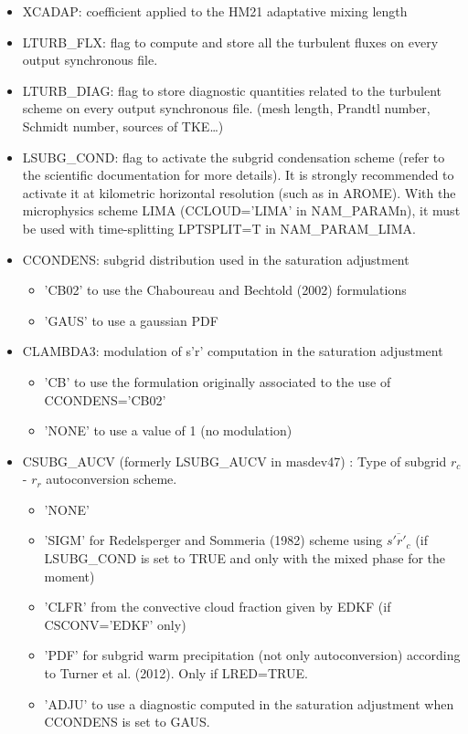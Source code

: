 \begin{itemize}
\item
{} 
XCADAP: coefficient applied to the HM21 adaptative mixing length

\item
{}
LTURB\_FLX: flag to compute and store all the turbulent fluxes
 on every output synchronous file.

\item
{}
LTURB\_DIAG: flag to  store diagnostic quantities related to the 
turbulent scheme  on every output synchronous file. (mesh length, Prandtl
number, Schmidt number, sources of TKE\ldots)

\item
{}
LSUBG\_COND: flag to activate the subgrid condensation scheme (refer to the scientific 
documentation for more details). It is strongly recommended to activate it at kilometric horizontal resolution (such as in AROME).  With the microphysics scheme LIMA (CCLOUD='LIMA' in NAM\_PARAMn), it must be used with time-splitting LPTSPLIT=T in NAM\_PARAM\_LIMA.

\item
{}
CCONDENS: subgrid distribution used in the saturation adjustment
\begin{itemize}
\item  'CB02' to use the Chaboureau and Bechtold (2002) formulations
\item 'GAUS' to use a gaussian PDF
\end{itemize}

\item
{}
CLAMBDA3: modulation of s'r' computation in the saturation adjustment
\begin{itemize}
\item 'CB' to use the formulation originally associated to the use of CCONDENS='CB02'
\item 'NONE' to use a value of 1 (no modulation)
\end{itemize}

\item
{}
CSUBG\_AUCV (formerly LSUBG\_AUCV in masdev47) : Type of subgrid $r_c$ - $r_r$ autoconversion scheme.
\begin{itemize}
\item  'NONE'
\item 'SIGM' for Redelsperger and Sommeria (1982) scheme using $\overline{s'r'_{c}}$ 
(if LSUBG\_COND
is set to TRUE and only with the mixed phase for the moment)
\item 'CLFR' from the convective cloud fraction given by EDKF 
(if CSCONV='EDKF' only)
\item 'PDF' for subgrid warm precipitation (not only autoconversion) according to Turner et al. (2012). Only if LRED=TRUE.
\item 'ADJU' to use a diagnostic computed in the saturation adjustment when CCONDENS is set to GAUS.
\end{itemize}


\end{itemize}
